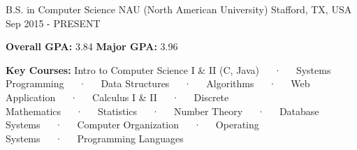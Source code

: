 \begin{cventries}
  \cventry
    {B.S. in Computer Science}
    {NAU (North American University)}
    {Stafford, TX, USA}
    {Sep 2015 - PRESENT}
    {
      \begin{cvitems}
      	\item{\textbf{Overall GPA:} 3.84
        \textbf{Major GPA:} 3.96
        }
        \item{\textbf{Key Courses:} Intro to Computer Science I \& II (C, Java)~~~·~~~Systems Programming~~~·~~~Data Structures~~~·~~~Algorithms~~~·~~~Web Application~~~·~~~Calculus I \& II~~~·~~~Discrete Mathematics~~~·~~~Statistics~~~·~~~Number Theory~~~·~~~Database Systems~~~·~~~Computer Organization~~~·~~~Operating Systems~~~·~~~Programming Languages}
      \end{cvitems}
    }
\end{cventries}
